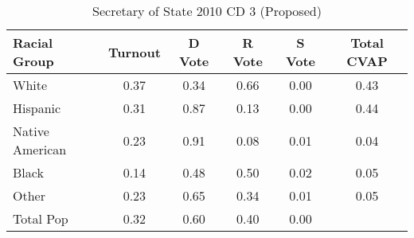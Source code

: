 \begin{table}[htb]
\begin{center}
\caption{Secretary of State 2010 CD 3 (Proposed)}
\label{sos10_cvap_cd_3}
\begin{tabular}{lccccc}
  \hline
Racial Group & Turnout & D Vote & R Vote & S Vote & Total CVAP \\ 
  \hline
White & 0.37 & 0.34 & 0.66 & 0.00 & 0.43 \\ 
  Hispanic & 0.31 & 0.87 & 0.13 & 0.00 & 0.44 \\ 
  Native American & 0.23 & 0.91 & 0.08 & 0.01 & 0.04 \\ 
  Black & 0.14 & 0.48 & 0.50 & 0.02 & 0.05 \\ 
  Other & 0.23 & 0.65 & 0.34 & 0.01 & 0.05 \\ 
  Total Pop & 0.32 & 0.60 & 0.40 & 0.00 &  \\ 
   \hline
\end{tabular}
\end{center}
\end{table}
